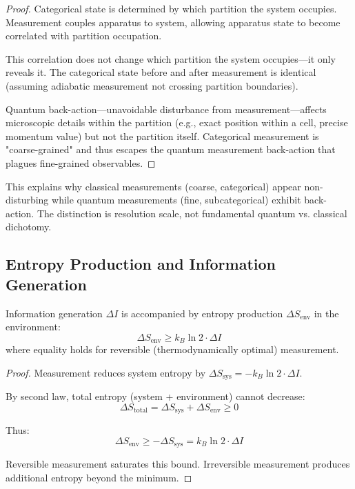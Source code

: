 \begin{proof}
Categorical state is determined by which partition the system occupies. Measurement couples apparatus to system, allowing apparatus state to become correlated with partition occupation.

This correlation does not change which partition the system occupies—it only reveals it. The categorical state before and after measurement is identical (assuming adiabatic measurement not crossing partition boundaries).

Quantum back-action—unavoidable disturbance from measurement—affects microscopic details within the partition (e.g., exact position within a cell, precise momentum value) but not the partition itself. Categorical measurement is "coarse-grained" and thus escapes the quantum measurement back-action that plagues fine-grained observables.
\end{proof}

This explains why classical measurements (coarse, categorical) appear non-disturbing while quantum measurements (fine, subcategorical) exhibit back-action. The distinction is resolution scale, not fundamental quantum vs. classical dichotomy.

\subsection{Entropy Production and Information Generation}

\begin{theorem}
\label{thm:entropy_info_duality}
Information generation $\Delta I$ is accompanied by entropy production $\Delta S_{\text{env}}$ in the environment:
\begin{equation}
\Delta S_{\text{env}} \geq k_B \ln 2 \cdot \Delta I
\end{equation}
where equality holds for reversible (thermodynamically optimal) measurement.
\end{theorem}

\begin{proof}
Measurement reduces system entropy by $\Delta S_{\text{sys}} = -k_B \ln 2 \cdot \Delta I$.

By second law, total entropy (system + environment) cannot decrease:
\begin{equation}
\Delta S_{\text{total}} = \Delta S_{\text{sys}} + \Delta S_{\text{env}} \geq 0
\end{equation}

Thus:
\begin{equation}
\Delta S_{\text{env}} \geq -\Delta S_{\text{sys}} = k_B \ln 2 \cdot \Delta I
\end{equation}

Reversible measurement saturates this bound. Irreversible measurement produces additional entropy beyond the minimum.
\end{proof}

